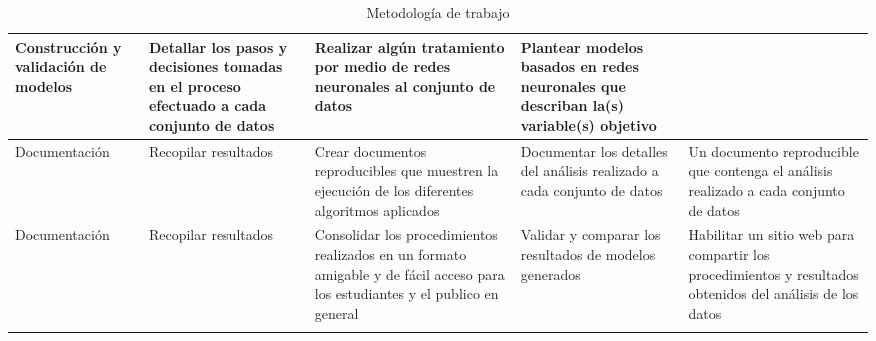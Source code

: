 \begin{xltabular}{\linewidth}{| X | X | X | X | X |}
		Construcci\'on y validaci\'on de modelos&
		Detallar los pasos y decisiones tomadas en el proceso efectuado a cada conjunto de datos&
		Realizar alg\'un tratamiento por medio de redes neuronales al conjunto de datos &
		Plantear modelos basados en redes neuronales que describan la(s) variable(s) objetivo\\
	\hline
		Documentaci\'on&
		Recopilar resultados&
		Crear documentos reproducibles que muestren la ejecuci\'on de los diferentes algoritmos aplicados&
		Documentar los detalles del an\'alisis realizado a cada conjunto de datos  &
		Un documento reproducible que contenga el an\'alisis realizado a cada conjunto de datos\\
	\hline
		Documentaci\'on&
		Recopilar resultados&
		Consolidar los procedimientos realizados en un formato amigable y de f\'acil acceso para los estudiantes y el publico en general&
		Validar y comparar los resultados de modelos generados&
		Habilitar un sitio web para compartir los procedimientos y resultados obtenidos del an\'alisis de los datos\\
	\hline	
	\caption{Metodolog\'ia de trabajo}
\end{xltabular}
